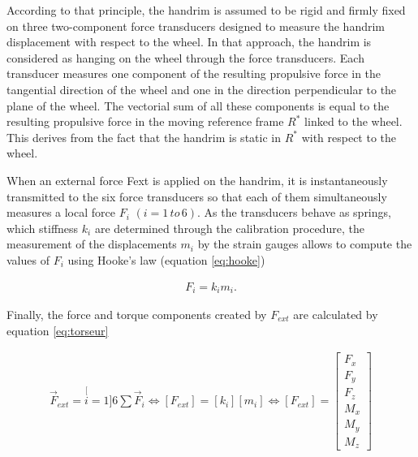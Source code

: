 According to that principle, the handrim is assumed to be rigid and firmly fixed on three two-component force transducers designed to measure the handrim displacement with respect to the wheel. In that approach, the handrim is considered as hanging on the wheel through the force transducers. Each transducer measures one component of the resulting propulsive force in the tangential direction of the wheel and one in the direction perpendicular to the plane of the wheel. The vectorial sum of all these components is equal to the resulting propulsive force in the moving reference frame $R^{*}$ linked to the wheel. This derives from the fact that the handrim is static in $R^{*}$ with respect to the wheel.


When an external force Fext is applied on the handrim, it is instantaneously transmitted to the six force transducers so that each of them simultaneously measures a local force $F_i$ $(i = 1 \, to \, 6)$. As the transducers behave as springs, which stiffness $k_i$ are determined through the calibration procedure, the measurement of the displacements $m_i$ by the strain gauges allows to compute the values of $F_i$ using Hooke's law (equation \ref{eq:hooke})

\begin{eqnarray}
F_i = k_i m_i.
\label{eq:hooke}
\end{eqnarray}



Finally, the force and torque components created by $F_{ext}$ are calculated by equation \ref{eq:torseur}

\begin{eqnarray}

\overrightarrow{F}_{ext}=
\stackrel[i=1]{6}{\sum}\vec{F}_{i}\iff\left[F_{ext}\right]=
\left[k_{i}\right]\left[m_{i}\right]\iff\left[F_{ext}\right]=\left[\begin{array}{c}
F_{x}\\
F_{y}\\
F_{z}\\
M_{x}\\
M_{y}\\
M_{z}
\end{array}\right]

\label{eq:torseur}

\end{eqnarray}

